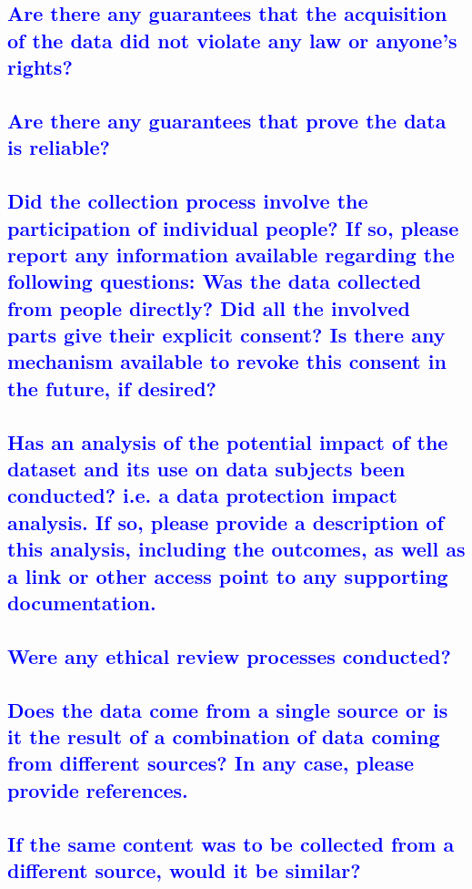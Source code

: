 \documentclass[letterpaper, 10 pt, conference]{ieeeconf}  %
\begin{document}
\textcolor{blue}{\subsection{Are there any guarantees that the acquisition of the data did not violate any law or anyone's rights?}}
\lipsum[1]

\textcolor{blue}{\subsection{Are there any guarantees that prove the data is reliable?}}
\lipsum[1]

\textcolor{blue}{\subsection{Did the collection process involve the participation of individual people? If so, please report any information available regarding the following questions: Was the data collected from people directly? Did all the involved parts give their explicit consent? Is there any mechanism available to revoke this consent in the future, if desired?}}
\lipsum[1]

\textcolor{blue}{\subsection{Has an analysis of the potential impact of the dataset and its use on data subjects been conducted? i.e. a data protection impact analysis. If so, please provide a description of this analysis, including the outcomes, as well as a link or other access point to any supporting documentation.}}
\lipsum[1]

\textcolor{blue}{\subsection{Were any ethical review processes conducted?}}
\lipsum[1]

\textcolor{blue}{\subsection{Does the data come from a single source or is it the result of a combination of data coming from different sources? In any case, please provide references.}}
\lipsum[1]

\textcolor{blue}{\subsection{If the same content was to be collected from a different source, would it be similar?}}
\lipsum[1]
\end{document}

